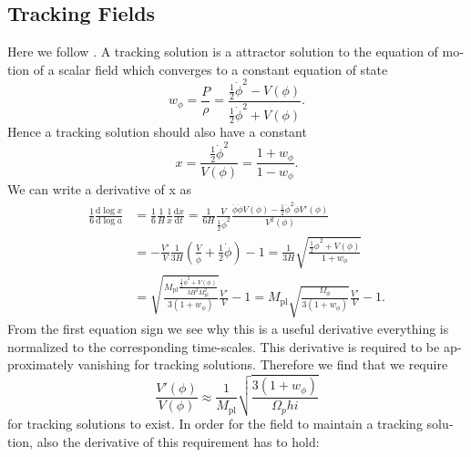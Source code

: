 \documentclass[master,       %
               twoside,        %
               BCOR10mm,       %
               english,ngerman, %
               ]{GAUBM}
\begin{document}
\begin{otherlanguage}{english}
\subsection{Tracking Fields}
Here we follow \cite[appendix A]{Deformed_potential_Bae_2019}.
A tracking solution is a attractor solution to the equation of motion of a scalar field which converges to a constant equation of state
\begin{equation}
	w_\phi = \frac{P}{\rho} = \frac{\frac{1}{2} \dot{\phi}^2 - V(\phi)}{\frac{1}{2} \dot{\phi}^2 + V(\phi)}.
\end{equation}
Hence a tracking solution should also have a constant 
\begin{equation}
	x = \frac{\frac{1}{2} \dot{\phi}^2}{V(\phi)} = \frac{1 + w_\phi}{1 - w_\phi}.
\end{equation}
We can write a derivative of x as
\begin{align}
	\frac{1}{6} \frac{\mathrm{d} \log x}{\mathrm{d} \log a}
	&= \frac{1}{6} \frac{1}{H} \frac{1}{x} \frac{\mathrm{d} x}{\mathrm{d} t}
	= \frac{1}{6 H} \frac{V}{\frac{1}{2} \dot{\phi}^2} \frac{\ddot{\phi} \dot{\phi} V(\phi) - \frac{1}{2} \dot{\phi}^2 \dot{\phi} V'(\phi)}{V^2(\phi)} \nonumber \\
	&= - \frac{V'}{V} \frac{1}{3 H} \left( \frac{V}{\dot{\phi}} + \frac{1}{2} \dot{\phi} \right) - 1 
	= \frac{1}{3 H} \sqrt{ \frac{ \frac{1}{2} \dot{\phi}^2 + V(\phi) }{1 + w_\phi}} \nonumber \\
	&= \sqrt{ \frac{ M_\mathrm{pl} \frac{ \frac{1}{2} \dot{\phi}^2 + V(\phi) } {3 H^2 M_\mathrm{pl}^2} }{3(1 + w_\phi)}} \frac{V'}{V} - 1
	= M_\mathrm{pl} \sqrt{ \frac{\Omega_\phi}{3(1 + w_\phi)}} \frac{V'}{V} - 1.
\end{align}
From the first equation sign we see why this is a useful derivative everything is normalized to the corresponding time-scales.
This derivative is required to be approximately vanishing for tracking solutions. Therefore we find that we require
\begin{equation}
	\frac{V'(\phi)}{V(\phi)} \approx \frac{1}{M_\mathrm{pl}} \sqrt{\frac{3(1 + w_\phi)}{\Omega_phi}}	
\end{equation}
for tracking solutions to exist.
In order for the field to maintain a tracking solution, also the derivative of this requirement has to hold:




\end{otherlanguage}
\end{document}

